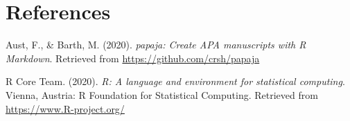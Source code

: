 \documentclass[
  english,
  man]{apa6}
\begin{document}
\newpage

\hypertarget{references}{%
\section{References}\label{references}}

\begingroup
\setlength{\parindent}{-0.5in}
\setlength{\leftskip}{0.5in}

\hypertarget{refs}{}
\leavevmode\hypertarget{ref-R-papaja}{}%
Aust, F., \& Barth, M. (2020). \emph{papaja: Create APA manuscripts with R Markdown}. Retrieved from \url{https://github.com/crsh/papaja}

\leavevmode\hypertarget{ref-R-base}{}%
R Core Team. (2020). \emph{R: A language and environment for statistical computing}. Vienna, Austria: R Foundation for Statistical Computing. Retrieved from \url{https://www.R-project.org/}

\endgroup


\clearpage
\theendnotes
\end{document}
